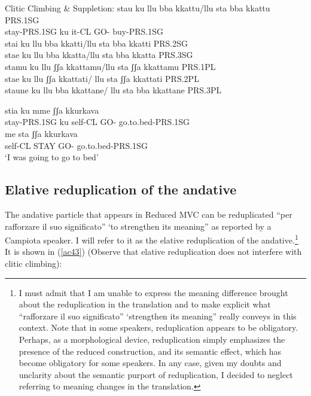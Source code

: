 \documentclass[output=paper]{langscibook}
\begin{document}
\ea \label{ac41}Clitic Climbing \& Suppletion:
    \ea \label{ac41a}\gll stau    ku     llu   bba  kkattu/llu sta bba kkattu \hfill PRS.1SG\\
    stay-PRS.1SG ku  it-CL  GO-  buy-PRS.1SG\\
    \glt stai ku llu bba kkatti/llu sta bba kkatti  \hfill     PRS.2SG\\
    stae ku llu bba kkatta/llu sta bba kkatta   \hfill    PRS.3SG\\
    stamu ku llu ʃʃa kkattamu/llu sta ʃʃa kkattamu \hfill  PRS.1PL\\
    stae ku llu ʃʃa kkattati/ llu sta ʃʃa kkattati  \hfill    PRS.2PL\\
    staune ku llu bba kkattane/ llu sta bba kkattane \hfill PRS.3PL\\
    \z
\z

\ea \label{ac42}
    \ea \label{ac42a}\gll stia       ku mme   ʃʃa   kkurkava \\
    stay-PRS.1SG ku self-CL  GO- go.to.bed-PRS.1SG\\
    \ex \label{ac42b}\gll me    sta    ʃʃa   kkurkava\\
    self-CL STAY GO- go.to.bed-PRS.1SG\\
    \glt ‘I was going to go to bed’
    \z
\z


\subsection{Elative reduplication of the andative}

The andative particle that appears in Reduced MVC can be reduplicated “per rafforzare il suo significato” ‘to strengthen its meaning” as reported by a Campiota speaker.  I will refer to it as the elative reduplication of the andative.\footnote{I must admit that I am unable to express the meaning difference brought about the reduplication in the translation and to make explicit what “rafforzare il suo significato” ‘strengthen its meaning” really conveys in this context.  Note that in some speakers, reduplication appears to be obligatory.  Perhaps, as a morphological device, reduplication simply emphasizes the presence of the reduced construction, and its semantic effect, which has become obligatory for some speakers. In any case, given my doubts and unclarity about the semantic purport of reduplication, I decided to neglect referring to meaning changes in the translation.}  It is shown in (\ref{ac43}) (Observe that elative reduplication does not interfere with clitic climbing):
\end{document}
